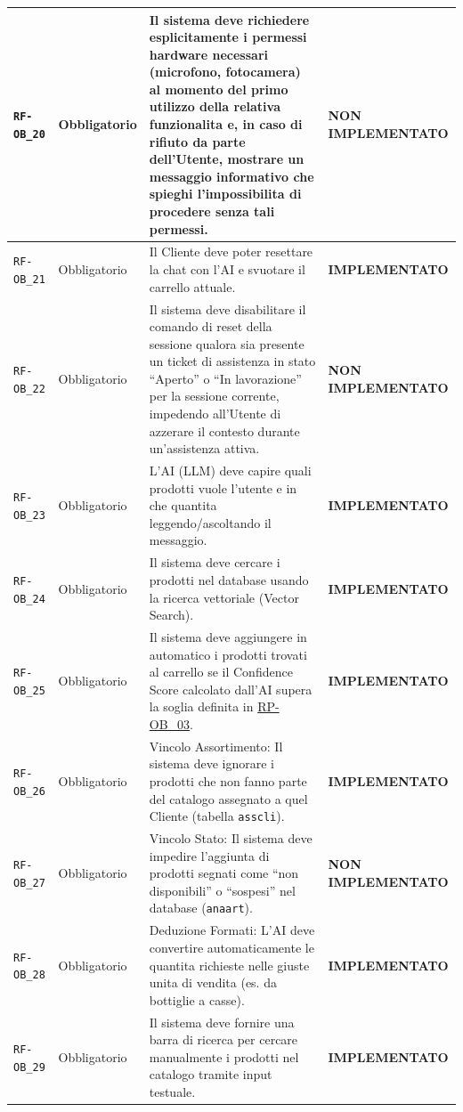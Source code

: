\documentclass[a4paper, 11pt, oneside]{scrartcl}
\begin{document}
\begin{longtable}{|>{\raggedright\arraybackslash}p{}|>{\raggedright\arraybackslash}p{}|>{\raggedright\arraybackslash}p{}|>{\raggedright\arraybackslash}p{}|}
    \hline
    \texttt{RF-OB\_20} & Obbligatorio & Il sistema deve richiedere esplicitamente i permessi hardware necessari (microfono, fotocamera) al momento del primo utilizzo della relativa funzionalita e, in caso di rifiuto da parte dell'Utente, mostrare un messaggio informativo che spieghi l'impossibilita di procedere senza tali permessi. & \textbf{NON IMPLEMENTATO} \\
    \hline
    \texttt{RF-OB\_21} & Obbligatorio & Il Cliente deve poter resettare la chat con l'AI e svuotare il carrello attuale. & \textbf{IMPLEMENTATO} \\
    \hline
    \texttt{RF-OB\_22} & Obbligatorio & Il sistema deve disabilitare il comando di reset della sessione qualora sia presente un ticket di assistenza in stato ``Aperto'' o ``In lavorazione'' per la sessione corrente, impedendo all'Utente di azzerare il contesto durante un'assistenza attiva. & \textbf{NON IMPLEMENTATO} \\
    \hline
    \texttt{RF-OB\_23} & Obbligatorio & L'AI (LLM) deve capire quali prodotti vuole l'utente e in che quantita leggendo/ascoltando il messaggio. & \textbf{IMPLEMENTATO} \\
    \hline
    \texttt{RF-OB\_24} & Obbligatorio & Il sistema deve cercare i prodotti nel database usando la ricerca vettoriale (Vector Search). & \textbf{IMPLEMENTATO} \\
    \hline
    \texttt{RF-OB\_25} & Obbligatorio & Il sistema deve aggiungere in automatico i prodotti trovati al carrello se il Confidence Score calcolato dall'AI supera la soglia definita in \hyperlink{rp-ob_3}{RP-OB\_03}. & \textbf{IMPLEMENTATO} \\
    \hline
    \texttt{RF-OB\_26} & Obbligatorio & Vincolo Assortimento: Il sistema deve ignorare i prodotti che non fanno parte del catalogo assegnato a quel Cliente (tabella \texttt{asscli}). & \textbf{IMPLEMENTATO} \\
    \hline
    \texttt{RF-OB\_27} & Obbligatorio & Vincolo Stato: Il sistema deve impedire l'aggiunta di prodotti segnati come ``non disponibili'' o ``sospesi'' nel database (\texttt{anaart}). & \textbf{NON IMPLEMENTATO} \\
    \hline
    \texttt{RF-OB\_28} & Obbligatorio & Deduzione Formati: L'AI deve convertire automaticamente le quantita richieste nelle giuste unita di vendita (es. da bottiglie a casse). & \textbf{IMPLEMENTATO} \\
    \hline
    \texttt{RF-OB\_29} & Obbligatorio & Il sistema deve fornire una barra di ricerca per cercare manualmente i prodotti nel catalogo tramite input testuale. & \textbf{IMPLEMENTATO} \\

\end{longtable}
\end{document}
